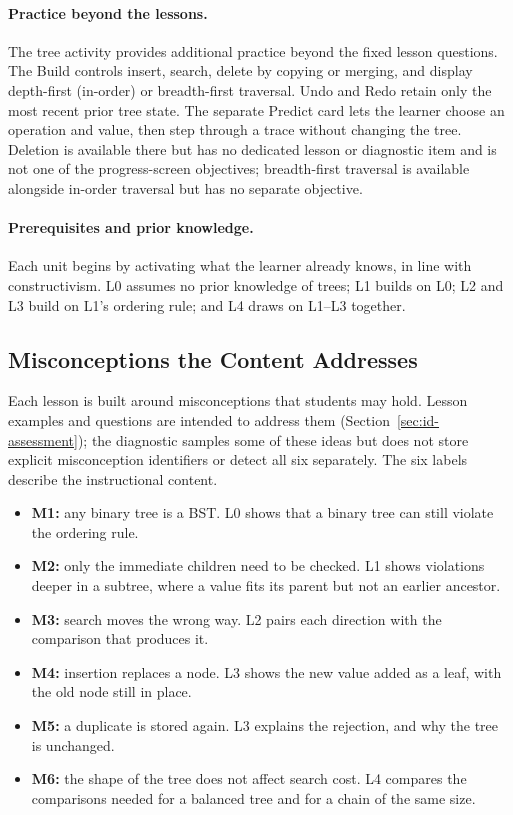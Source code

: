 \paragraph{Practice beyond the lessons.} The tree activity provides additional practice beyond the fixed lesson questions. The Build controls insert, search, delete by copying or merging, and display depth-first (in-order) or breadth-first traversal. Undo and Redo retain only the most recent prior tree state. The separate Predict card lets the learner choose an operation and value, then step through a trace without changing the tree. Deletion is available there but has no dedicated lesson or diagnostic item and is not one of the progress-screen objectives; breadth-first traversal is available alongside in-order traversal but has no separate objective.

\paragraph{Prerequisites and prior knowledge.} Each unit begins by activating what the learner already knows, in line with constructivism. L0 assumes no prior knowledge of trees; L1 builds on L0; L2 and L3 build on L1's ordering rule; and L4 draws on L1--L3 together.

\subsection{Misconceptions the Content Addresses}
Each lesson is built around misconceptions that students may hold. Lesson examples and questions are intended to address them (Section~\ref{sec:id-assessment}); the diagnostic samples some of these ideas but does not store explicit misconception identifiers or detect all six separately. The six labels describe the instructional content.

\begin{itemize}
    \item \textbf{M1:} any binary tree is a BST. L0 shows that a binary tree can still violate the ordering rule.
    \item \textbf{M2:} only the immediate children need to be checked. L1 shows violations deeper in a subtree, where a value fits its parent but not an earlier ancestor.
    \item \textbf{M3:} search moves the wrong way. L2 pairs each direction with the comparison that produces it.
    \item \textbf{M4:} insertion replaces a node. L3 shows the new value added as a leaf, with the old node still in place.
    \item \textbf{M5:} a duplicate is stored again. L3 explains the rejection, and why the tree is unchanged.
    \item \textbf{M6:} the shape of the tree does not affect search cost. L4 compares the comparisons needed for a balanced tree and for a chain of the same size.
\end{itemize}

